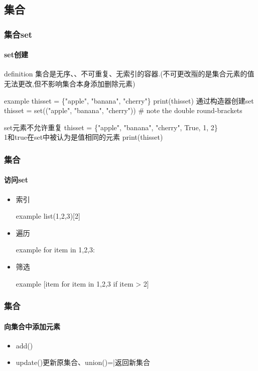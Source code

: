 \documentclass{beamer}
\begin{document}
\subsection{集合}

\begin{frame}[t]
	\frametitle{集合set}
	\framesubtitle{set创建}
	\begin{block}{definition}
		集合是无序、、不可重复、无索引的容器.(不可更改🈯的是集合元素的值无法更改,但不影响集合本身添加删除元素)
	\end{block}
	\pause
	\begin{block}{example}
		thisset = \{"apple", "banana", "cherry"\}
		print(thisset)
		通过构造器创建set thisset = set(("apple", "banana", "cherry")) # note the double round-brackets
	\end{block}
	\pause
	\begin{alertblock}{set元素不允许重复}
		thisset = \{"apple", "banana", "cherry", True, 1, 2\}\\1和true在set中被认为是值相同的元素
		print(thisset)
	\end{alertblock}
\end{frame}
\begin{frame}[t]
	\frametitle{集合}
	\framesubtitle{访问set}
	\begin{itemize}
		\item<1-> 索引
			\pause
			\begin{block}{example}
				list({1,2,3})[2]
			\end{block}
			\pause
		\item<2-> 遍历
			\pause
			\begin{block}{example}
			for item in {1,2,3}:
			\end{block}
			\pause
		\item<3-> 筛选
			\pause
			\begin{block}{example}
				[item for item in {1,2,3} if item > 2]
			\end{block}

	\end{itemize}
\end{frame}

\begin{frame}[t]
	\frametitle{集合}
	\framesubtitle{向集合中添加元素}
	\begin{itemize}
		\item add()
		\item update()更新原集合、union()=|返回新集合
	\end{itemize}
\end{frame}
\end{document}
